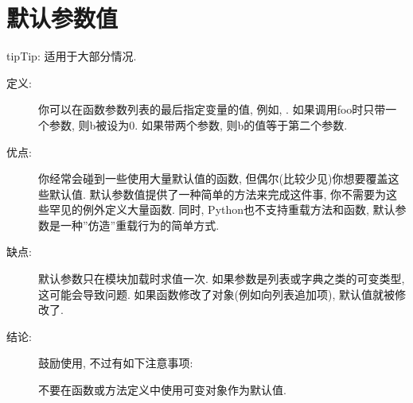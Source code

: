 \documentclass[a4paper,10pt,english]{sphinxmanual}
\begin{document}
\section{默认参数值}
\label{\detokenize{python_language_rules:id9}}
\begin{sphinxadmonition}{tip}{Tip:}
适用于大部分情况.
\end{sphinxadmonition}
\begin{description}
\item[{定义:}] \leavevmode
你可以在函数参数列表的最后指定变量的值, 例如,  . 如果调用foo时只带一个参数, 则b被设为0. 如果带两个参数, 则b的值等于第二个参数.

\item[{优点:}] \leavevmode
你经常会碰到一些使用大量默认值的函数, 但偶尔(比较少见)你想要覆盖这些默认值. 默认参数值提供了一种简单的方法来完成这件事, 你不需要为这些罕见的例外定义大量函数. 同时, Python也不支持重载方法和函数, 默认参数是一种”仿造”重载行为的简单方式.

\item[{缺点:}] \leavevmode
默认参数只在模块加载时求值一次. 如果参数是列表或字典之类的可变类型, 这可能会导致问题. 如果函数修改了对象(例如向列表追加项), 默认值就被修改了.

\item[{结论:}] \leavevmode
鼓励使用, 不过有如下注意事项:

不要在函数或方法定义中使用可变对象作为默认值.

%
\begin{sphinxVerbatim}[commandchars=\\\{\}]
   
            
               \PYG{p}{[}\PYG{p}{]}
\end{sphinxVerbatim}

%
\begin{sphinxVerbatim}[commandchars=\\\{\}]
    \PYG{p}{[}\PYG{p}{]}
      
      
\end{sphinxVerbatim}

\end{description}
\end{document}
